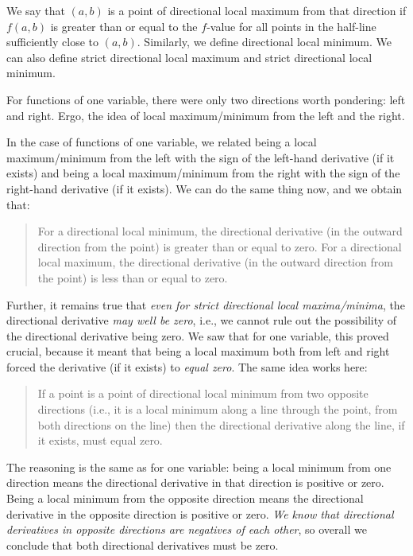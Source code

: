 \documentclass[10pt]{amsart}
\begin{document}
We say that $(a,b)$ is a point of directional local maximum from that
direction if $f(a,b)$ is greater than or equal to the $f$-value for
all points in the half-line sufficiently close to $(a,b)$. Similarly,
we define directional local minimum. We can also define strict
directional local maximum and strict directional local minimum.

For functions of one variable, there were only two directions worth
pondering: left and right. Ergo, the idea of local maximum/minimum
from the left and the right.

In the case of functions of one variable, we related being a local
maximum/minimum from the left with the sign of the left-hand
derivative (if it exists) and being a local maximum/minimum from the
right with the sign of the right-hand derivative (if it exists). We
can do the same thing now, and we obtain that:

\begin{quote}
  For a directional local minimum, the directional derivative (in the
  outward direction from the point) is greater than or equal to
  zero. For a directional local maximum, the directional derivative
  (in the outward direction from the point) is less than or equal to zero.
\end{quote}

Further, it remains true that {\em even for strict directional local
maxima/minima}, the directional derivative {\em may well be zero},
i.e., we cannot rule out the possibility of the directional derivative
being zero. We saw that for one variable, this proved crucial, because
it meant that being a local maximum both from left and right forced
the derivative (if it exists) to {\em equal zero}. The same idea works here:

\begin{quote}
  If a point is a point of directional local minimum from two opposite
  directions (i.e., it is a local minimum along a line through the
  point, from both directions on the line) then the directional
  derivative along the line, if it exists, must equal zero.
\end{quote}

The reasoning is the same as for one variable: being a local minimum
from one direction means the directional derivative in that direction
is positive or zero. Being a local minimum from the opposite direction
means the directional derivative in the opposite direction is positive
or zero. {\em We know that directional derivatives in opposite
directions are negatives of each other}, so overall we conclude that
both directional derivatives must be zero.
\end{document}

